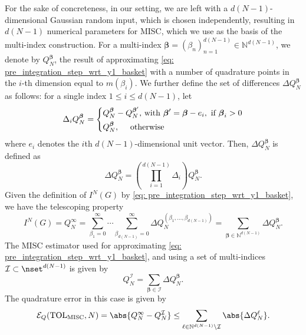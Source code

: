 For the sake of concreteness, in our setting, we are left with a $d (N-1)$-dimensional Gaussian random input, which is chosen independently, resulting in  $d (N-1)$ numerical parameters for MISC, which we use as the basis of the multi-index construction. For a multi-index $\boldsymbol{\beta} = (\beta_n)_{n=1}^{d (N-1)} \in \mathbb{N}^{d (N-1)}$, we denote  by
$Q_N^{\boldsymbol{\beta}}$,   the result of approximating \eqref{eq: pre_integration_step_wrt_y1_basket} with a number of quadrature points  in the $i$-th dimension equal to  $m(\beta_i)$. We further define the set of
differences $\Delta Q_N^{\boldsymbol{\beta}}$ as follows: for a single index $1 \le i \le d (N-1)$,
let
\begin{equation*}
\Delta_i Q_N^{\boldsymbol{\beta}} = \left\{ 
\aligned 
 Q_N^{\boldsymbol{\beta}} &- Q_N^{\boldsymbol{\beta}'}  \text{, with } \boldsymbol{\beta}' =\boldsymbol{\beta} - e_i, \text{ if } \boldsymbol{\beta}_i>0 \\
 Q_N^{\boldsymbol{\beta}} &, \quad  \text{ otherwise}
\endaligned
\right.
\end{equation*}
where $e_i$ denotes the $i$th $d (N-1)$-dimensional unit vector. Then, $\Delta
Q_N^{\boldsymbol{\beta}}$ is defined as
\begin{equation*}
\Delta Q_N^{\boldsymbol{\beta}} = \left( \prod_{i=1}^{d (N-1)} \Delta_i \right) Q_N^{\boldsymbol{\beta}}.
\end{equation*}
Given the definition of $I^{N}(G)$ by \eqref{eq: pre_integration_step_wrt_y1_basket}, we have the telescoping property
\begin{equation*}
I^{N}(G)=Q_N^\infty = \sum_{\beta_1=0}^\infty \cdots \sum_{\beta_{d (N-1)} = 0}^\infty \Delta
Q_N^{(\beta_1, \ldots, \beta_{d (N-1)})} = \sum_{\boldsymbol{\beta} \in \mathbb{N}^{d (N-1)}} \Delta Q_N^{\boldsymbol{\beta}}.
\end{equation*}
The MISC estimator used for approximating \eqref{eq: pre_integration_step_wrt_y1_basket}, and using a set of multi-indices $\mathcal{I}\subset \nset^{d (N-1)}$ is given by
\begin{equation}\label{eq:MISC_quad_estimator}
	Q_N^{\mathcal{I}} = \sum_{\boldsymbol{\beta} \in \mathcal{I}} \Delta Q_N^{\boldsymbol{\beta}}.
\end{equation}
The quadrature error in this  case  is given by
\begin{equation}\label{eq:quadrature error}
\mathcal{E}_Q(\text{TOL}_{\text{MISC}},N) =\abs{Q_N^\infty - Q_N^\mathcal{I}} \le \sum_{\ell \in \mathbb{N}^{d(N-1)} \setminus
	\mathcal{I}} \abs{\Delta Q_N^\ell}.
\end{equation}
